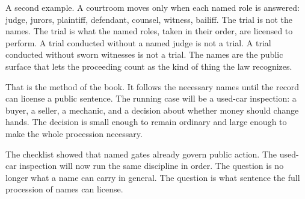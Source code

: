 A second example. A courtroom moves only when each named role is answered:
judge, jurors, plaintiff, defendant, counsel, witness, bailiff. The trial
is not the names. The trial is what the named roles, taken in their order,
are licensed to perform. A trial conducted without a named judge is not a
trial. A trial conducted without sworn witnesses is not a trial. The names
are the public surface that lets the proceeding count as the kind of thing
the law recognizes.

That is the method of the book. It follows the necessary names until the
record can license a public sentence. The running case will be a used-car
inspection: a buyer, a seller, a mechanic, and a decision about whether
money should change hands. The decision is small enough to remain ordinary
and large enough to make the whole procession necessary.

\begin{handoff}

The checklist showed that named gates already govern public action. The used-car
inspection will now run the same discipline in order. The question is no longer
what a name can carry in general. The question is what sentence the full
procession of names can license.

\end{handoff}
